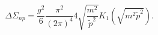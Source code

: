 \begin{equation}
\Delta\Sigma_{np} = \frac{g^2}6\frac{\pi^2}{(2\pi)^4} 
4\sqrt{\frac{m^2}{\tilde p^2}} K_1\left(\sqrt{m^2\tilde p^2}\right). 
\label{BesselK}
\end{equation}

